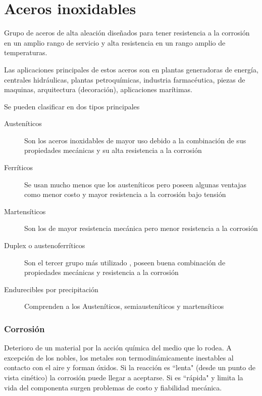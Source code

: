 \part{Aceros inoxidables}
Grupo de aceros de alta aleación diseñados para tener resistencia a la corrosión en un amplio rango de servicio y alta resistencia en un rango amplio de temperaturas.

Las aplicaciones principales de estos aceros son en plantas generadoras de energía, centrales hidráulicas, plantas petroquímicas, industria farmacéutica, piezas de maquinas, arquitectura (decoración), aplicaciones marítimas.

Se pueden clasificar en dos tipos principales
\begin{description}
	\item[Austeníticos] Son los aceros inoxidables de mayor uso debido a la combinación de sus propiedades mecánicas y su alta resistencia a la corrosión
	\item[Ferríticos] Se usan mucho menos que los austeníticos pero poseen algunas ventajas como menor costo y mayor resistencia a la corrosión bajo tensión
	\item[Martensíticos] Son los de mayor resistencia mecánica pero menor resistencia a la corrosión
	\item[Duplex o austenoferríticos] Son el tercer grupo más utilizado , poseen buena combinación de propiedades mecánicas y resistencia a la corrosión
	\item[Endurecibles por precipitación] Comprenden a los Austeníticos, semiausteníticos y martensíticos  
\end{description}

\section{Corrosión}
Deterioro de un material por la acción química del medio que lo rodea. A excepción de los nobles, los metales son termodinámicamente inestables al contacto con el aire y forman óxidos. Si la reacción es ``lenta"{} (desde un punto de vista cinético) la corrosión puede llegar a aceptarse. Si es ``rápida"{} y limita la vida del componenta surgen problemas de costo y fiabilidad mecánica.

